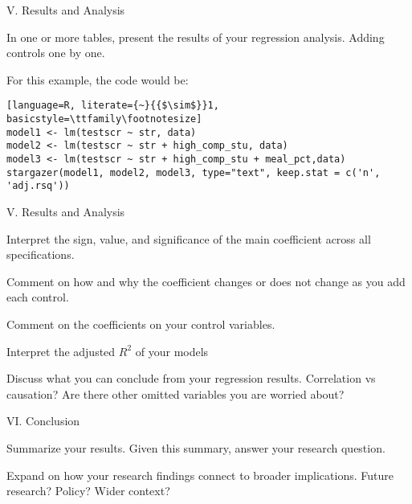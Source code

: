 \documentclass{./../Lectures/div_teaching_slides}
\begin{document}
\begin{frame}[fragile]{V. Results and Analysis}
\begin{witemize}
\item In one or more tables, present the results of your regression analysis. Adding controls one by one.
\item For this example, the code would be:
\end{witemize}
\begin{lstlisting}[language=R, literate={~}{{$\sim$}}1, basicstyle=\ttfamily\footnotesize]
model1 <- lm(testscr ~ str, data)
model2 <- lm(testscr ~ str + high_comp_stu, data)
model3 <- lm(testscr ~ str + high_comp_stu + meal_pct,data)
stargazer(model1, model2, model3, type="text", keep.stat = c('n', 'adj.rsq'))
\end{lstlisting}
\end{frame}

\begin{frame}{V. Results and Analysis}
\begin{witemize}
\item Interpret the sign, value, and significance of the main coefficient across all specifications.
\item Comment on how and why the coefficient changes or does not change as you add each control.
\item Comment on the coefficients on your control variables. 
\item Interpret the adjusted $R^2$ of your models
\item Discuss what you can conclude from your regression results. Correlation vs causation? Are there other omitted variables you are worried about?
\end{witemize}
\end{frame}

\begin{frame}{}
\centering \small

\end{frame}


\begin{frame}{VI. Conclusion}
\begin{witemize}
  \item Summarize your results. Given this summary, answer your research question.
  \item Expand on how your research findings connect to broader implications. Future research? Policy? Wider context?
\end{witemize}
\end{frame}
\end{document}
